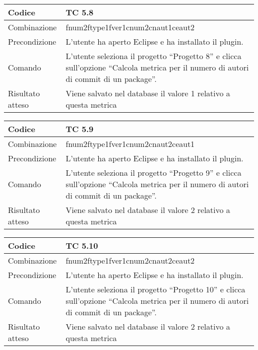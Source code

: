 \begin{table}[ht]
\begin{tabular}{|p{3cm}|p{9cm}|}
\hline
\cellcolor{lightgray}Codice				& TC 5.8								\\
\hline
\cellcolor{lightgray}Combinazione		& fnum2ftype1fver1cnum2cnaut1ceaut2 									\\
\hline
\cellcolor{lightgray}Precondizione		& L'utente ha aperto Eclipse e ha installato il plugin.				\\
\hline
\cellcolor{lightgray}Comando			& L'utente seleziona il progetto ``Progetto 8''  e clicca sull'opzione ``Calcola metrica per il numero di autori di commit di un package''.	\\
\hline
\cellcolor{lightgray}Risultato atteso	& Viene salvato nel database il valore 1 relativo a questa metrica	\\
\hline
\end{tabular}
\end{table}

\begin{table}[ht]
\begin{tabular}{|p{3cm}|p{9cm}|}
\hline
\cellcolor{lightgray}Codice				& TC 5.9								\\
\hline
\cellcolor{lightgray}Combinazione		& fnum2ftype1fver1cnum2cnaut2ceaut1 									\\
\hline
\cellcolor{lightgray}Precondizione		& L'utente ha aperto Eclipse e ha installato il plugin.								\\
\hline
\cellcolor{lightgray}Comando			& L'utente seleziona il progetto ``Progetto 9''  e clicca sull'opzione ``Calcola metrica per il numero di autori di commit di un package''.	\\
\hline
\cellcolor{lightgray}Risultato atteso	& Viene salvato nel database il valore 2 relativo a questa metrica	\\
\hline
\end{tabular}
\end{table}

\begin{table}[ht]
\begin{tabular}{|p{3cm}|p{9cm}|}
\hline
\cellcolor{lightgray}Codice				& TC 5.10								\\
\hline
\cellcolor{lightgray}Combinazione		& fnum2ftype1fver1cnum2cnaut2ceaut2 									\\
\hline
\cellcolor{lightgray}Precondizione		& L'utente ha aperto Eclipse e ha installato il plugin.									\\
\hline
\cellcolor{lightgray}Comando			& L'utente seleziona il progetto ``Progetto 10''  e clicca sull'opzione ``Calcola metrica per il numero di autori di commit di un package''.	\\
\hline
\cellcolor{lightgray}Risultato atteso	& Viene salvato nel database il valore 2 relativo a questa metrica	\\
\hline
\end{tabular}
\end{table}

